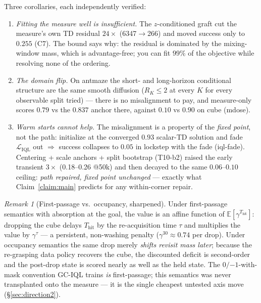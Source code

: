 \documentclass[11pt]{article}
\newcommand{\E}{\mathbb{E}}
\theoremstyle{definition}
\theoremstyle{remark}
\newtheorem{remark}{Remark}
\begin{document}
Three corollaries, each independently verified:

\begin{enumerate}[leftmargin=1.6em,itemsep=2pt]
\item \emph{Fitting the measure well is insufficient.} The $z$-conditioned graft cut the
measure's own TD residual $24\times$ (6347$\to$266) and moved success only to $0.255$ (C7).
The bound says why: the residual is dominated by the mixing-window mass, which is
advantage-free; you can fit $99\%$ of the objective while resolving none of the ordering.
\item \emph{The domain flip.} On antmaze the short- and long-horizon conditional structure
are the same smooth diffusion ($R_K\le 2$ at every $K$ for every observable split tried) ---
there is no misalignment to pay, and measure-only scores $0.79$ vs the $0.837$ anchor there,
against $0.10$ vs $0.90$ on cube (mdose).
\item \emph{Warm starts cannot help.} The misalignment is a property of the \emph{fixed
point}, not the path: initialize at the converged $0.93$ scalar-TD solution and fade
$\mathcal L_{\mathrm{IQL}}$ out $\Rightarrow$ success collapses to $0.05$ in lockstep with
the fade (iql-fade). Centering + scale anchors + split bootstrap (T10-b2) raised the early
transient $3\times$ (0.18--0.26 @50k) and then decayed to the same $0.06$--$0.10$ ceiling:
\emph{path repaired, fixed point unchanged} --- exactly what
Claim~\ref{claim:main} predicts for any within-corner repair.
\end{enumerate}

\begin{remark}[First-passage vs.\ occupancy, sharpened]\label{rem:firstpassage}
Under first-passage semantics with absorption at the goal, the value is an affine function of
$\E[\gamma^{T_{\mathrm{hit}}}]$: dropping the cube delays $T_{\mathrm{hit}}$ by the
re-acquisition time $\tau$ and multiplies the value by $\gamma^{\tau}$ --- a persistent,
non-washing penalty ($\gamma^{30}\approx0.74$ per drop). Under occupancy semantics the same
drop merely \emph{shifts revisit mass later}; because the re-grasping data policy recovers
the cube, the discounted deficit is second-order and the post-drop state is scored nearly as
well as the held state. The $0/{-1}$-with-mask convention GC-IQL trains \emph{is}
first-passage; this semantics was never transplanted onto the measure --- it is the single
cheapest untested axis move (\S\ref{sec:direction2}).
\end{remark}
\end{document}
